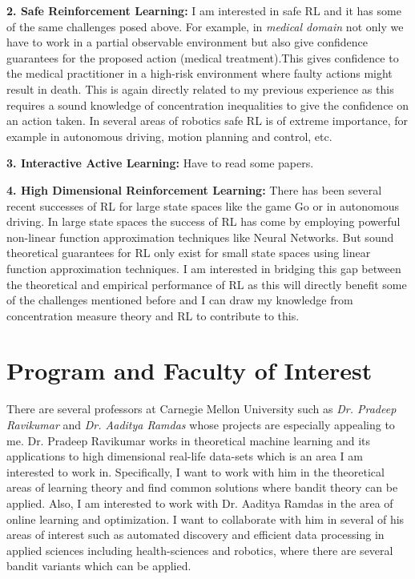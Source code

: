 \documentclass[twoside]{article}
\begin{document}
\textbf{2. Safe Reinforcement Learning:} I am interested in safe RL and it has some of the same challenges posed above. For example, in \textit{medical domain} not only we have to work in a partial observable environment but also give confidence guarantees for the proposed action (medical treatment).This gives confidence to the medical practitioner in a high-risk environment where faulty actions might result in death. This is again directly related to my previous experience as this requires a sound knowledge of concentration inequalities to give the confidence on an action taken. In several areas of robotics safe RL is of extreme importance, for example in autonomous driving, motion planning and control, etc.


\textbf{3. Interactive Active Learning:}  Have to read some papers.


\textbf{4. High Dimensional Reinforcement Learning:} There has been several recent successes of RL for large state spaces like the game Go or in autonomous driving. In large state spaces the success of RL has come by employing powerful non-linear function approximation techniques like Neural Networks. But sound theoretical guarantees for RL only exist for small state spaces using linear function approximation techniques. I am interested in bridging this gap between the theoretical and empirical performance of RL as this will directly benefit some of the challenges mentioned before and I can draw my knowledge from concentration measure theory and RL to contribute to this.

\section{Program and Faculty of Interest}

There are several professors at Carnegie Mellon University such as \textit{Dr. Pradeep Ravikumar} and \textit{Dr. Aaditya Ramdas} whose projects are especially appealing to me. Dr. Pradeep Ravikumar works in theoretical machine learning and its applications to high dimensional real-life data-sets which is an area I am interested to work in. Specifically, I want to work with him in the theoretical areas of learning theory and find common solutions where bandit theory can be applied. Also, I am interested to work with Dr. Aaditya Ramdas in the area of online learning and optimization. I want to collaborate with him in several of his areas of interest such as automated discovery and efficient data processing in applied sciences including health-sciences and robotics, where there are several bandit variants which can be applied.
\end{document}
